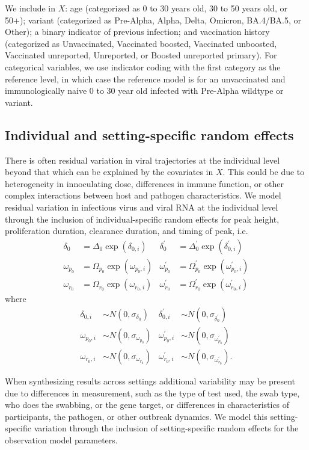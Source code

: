 \documentclass[11pt]{article}
\begin{document}
We include in $X$: age (categorized as 0 to 30 years old, 30 to 50 years old, or 50+); variant (categorized as Pre-Alpha, Alpha, Delta, Omicron, BA.4/BA.5, or Other); a binary indicator of previous infection; and vaccination history (categorized as Unvaccinated, Vaccinated boosted, Vaccinated unboosted, Vaccinated unreported, Unreported, or Boosted unreported primary). For categorical variables, we use indicator coding with the first category as the reference level, in which case the reference model is for an unvaccinated and immunologically naive 0 to 30 year old infected with Pre-Alpha wildtype or variant.

\subsection{Individual and setting-specific random effects}
There is often residual variation in viral trajectories at the individual level beyond that which can be explained by the covariates in $X$. This could be due to heterogeneity in innoculating dose, differences in immune function, or other complex interactions between host and pathogen characteristics. We model residual variation in infectious virus and viral RNA at the individual level through the inclusion of individual-specific random effects for peak height, proliferation duration, clearance duration, and timing of peak, i.e. 
\begin{align*}
    \delta_0 &= \Delta_0 \exp(\delta_{0,i}) & \delta^\prime_0 &= \Delta^\prime_0 \exp(\delta^\prime_{0,i}) \\
    \omega_{p_0} &= \Omega_{p_0} \exp( \omega_{p_0,i}) & \omega^\prime_{p_0} &= \Omega^\prime_{p_0} \exp( \omega^\prime_{p_0,i}) \\
    \omega_{r_0}  &= \Omega_{r_0} \exp(\omega_{r_0,i}) & \omega^\prime_{r_0}  &= \Omega^\prime_{r_0} \exp(\omega^\prime_{r_0,i})
\end{align*}
where 
\begin{align*}
\delta_{0,i} &\sim N(0, \sigma_{\delta_0}) & \delta^\prime_{0,i} &\sim N(0, \sigma_{\delta^\prime_0}) \\
\omega_{p_0,i} &\sim N(0, \sigma_{\omega_{p_0}}) & \omega^\prime_{p_0,i} &\sim N(0, \sigma_{\omega^\prime_{p_0}}) \\
\omega_{r_0,i} &\sim N(0, \sigma_{\omega_{r_0}}) & \omega^\prime_{r_0,i} &\sim N(0, \sigma_{\omega^\prime_{r_0}}).
\end{align*}

When synthesizing results across settings additional variability may be present due to differences in measurement, such as the type of test used, the swab type, who does the swabbing, or the gene target, or differences in characteristics of participants, the pathogen, or other outbreak dynamics. We model this setting-specific variation through the inclusion of setting-specific random effects for the observation model parameters. 
\end{document}
